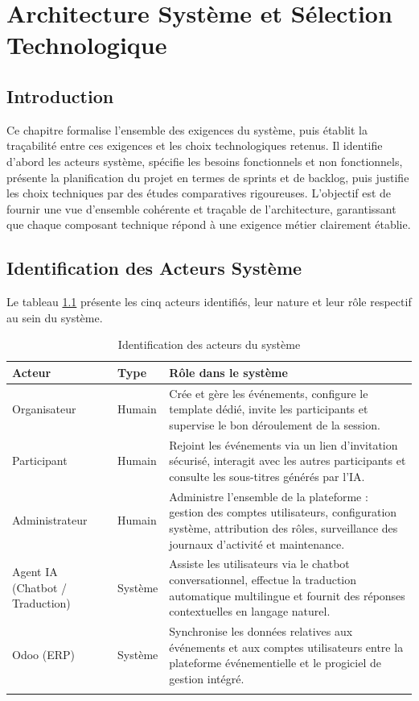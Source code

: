 \chapter{Architecture Système et Sélection Technologique}

\section*{Introduction}
Ce chapitre formalise l'ensemble des exigences du système, puis établit la traçabilité entre ces exigences et les choix technologiques retenus. Il identifie d'abord les acteurs système, spécifie les besoins fonctionnels et non fonctionnels, présente la planification du projet en termes de sprints et de backlog, puis justifie les choix techniques par des études comparatives rigoureuses. L'objectif est de fournir une vue d'ensemble cohérente et traçable de l'architecture, garantissant que chaque composant technique répond à une exigence métier clairement établie.

\section{Identification des Acteurs Système}
Le tableau \ref{tab:acteurs} présente les cinq acteurs identifiés, leur nature et leur rôle respectif au sein du système.

\begin{longtable}{|m{3.5cm}|m{2cm}|m{8cm}|}
\hline
\textbf{Acteur} & \textbf{Type} & \textbf{Rôle dans le système} \\
\hline
\endhead
\endfoot
\endlastfoot
\hline
Organisateur & Humain & Crée et gère les événements, configure le template dédié, invite les participants et supervise le bon déroulement de la session. \\
\hline
Participant & Humain & Rejoint les événements via un lien d'invitation sécurisé, interagit avec les autres participants et consulte les sous-titres générés par l'IA. \\
\hline
Administrateur & Humain & Administre l'ensemble de la plateforme : gestion des comptes utilisateurs, configuration système, attribution des rôles, surveillance des journaux d'activité et maintenance. \\
\hline
Agent IA (Chatbot / Traduction) & Système & Assiste les utilisateurs via le chatbot conversationnel, effectue la traduction automatique multilingue et fournit des réponses contextuelles en langage naturel. \\
\hline
Odoo (ERP) & Système & Synchronise les données relatives aux événements et aux comptes utilisateurs entre la plateforme événementielle et le progiciel de gestion intégré. \\
\hline
\captionsetup{justification=centering,margin=2cm}
\caption{Identification des acteurs du système}
\label{tab:acteurs}
\end{longtable}

